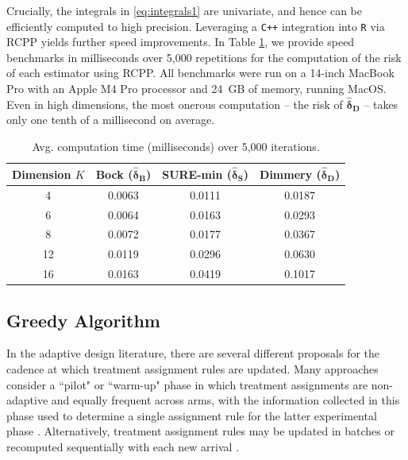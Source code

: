 \documentclass{article}
\newcommand{\bsdeltad}{\boldsymbol{\hat \delta_{\textbf{D}}}}
\newcommand{\bsdeltb}{\boldsymbol {\hat \delta_B}}
\newcommand{\bsdelts}{\boldsymbol {\hat \delta_S}}
\begin{document}
Crucially, the integrals in \eqref{eq:integrals1} are univariate, and hence can be efficiently computed to high precision. Leveraging a \texttt{C++} integration into \texttt{R} via RCPP \citep{rcpp} yields further speed improvements. In Table \ref{tab:risk_timing}, we provide speed benchmarks in milliseconds over 5,000 repetitions for the computation of the risk of each estimator using RCPP.
All benchmarks were run on a 14-inch MacBook Pro with an Apple M4 Pro processor and 24~GB of memory, running MacOS. Even in high dimensions, the most onerous computation -- the risk of $\bsdeltad$ -- takes only one tenth of a millisecond on average. 

\begin{table}[ht]
\centering
\caption{Avg. computation time (milliseconds) over 5,000 iterations.}
\label{tab:risk_timing}
\begin{tabular}{cccc}
\toprule
Dimension  $K$ & Bock ($\bsdeltb$)  & SURE-min ($\bsdelts$) & Dimmery ($\bsdeltad$) \\
\midrule
4  & 0.0063 & 0.0111 & 0.0187 \\
6  & 0.0064 & 0.0163 & 0.0293 \\
8  & 0.0072 & 0.0177 & 0.0367 \\
12 & 0.0119 & 0.0296 & 0.0630 \\
16 & 0.0163 & 0.0419 & 0.1017 \\
\bottomrule
\end{tabular}
\end{table}

\subsection{Greedy Algorithm}

In the adaptive design literature, there are several different proposals for the cadence at which treatment assignment rules are updated. Many approaches consider a ``pilot" or ``warm-up" phase in which treatment assignments are non-adaptive and equally frequent across arms, with the information collected in this phase used to determine a single assignment rule for the latter experimental phase \citep{blackwell2022batch, cai2024performance, tabord2018stratification, hahn2011adaptive}. Alternatively, treatment assignment rules may be updated in batches \citep{LiOwen2024, zhang2020inference, zhao2023adaptive} or recomputed sequentially with each new arrival \citep{kato2020efficient, dai2023clip}. 
\end{document}
